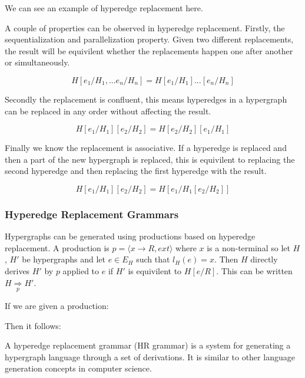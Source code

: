     We can see an example of hyperedge replacement here.
    
    

    A couple of properties can be observed in hyperedge replacement. Firstly, the sequentialization and parallelization property. Given two different replacements, the result will be equivilent whether the replacements happen one after another or simultaneously.

    \begin{equation}
    H[e_1/H_1,...e_n/H_n] = H[e_1/H_1]...[e_n/H_n]
    \end{equation}

    Secondly the replacement is confluent, this means hyperedges in a hypergraph can be replaced in any order without affecting the result.

    \begin{equation}
    H[e_1/H_1][e_2/H_2] = H[e_2/H_2][e_1/H_1]
    \end{equation}

    Finally we know the replacement is associative. If a hyperedge is replaced and then a part of the new hypergraph is replaced, this is equivilent to replacing the second hyperedge and then replacing the first hyperedge with the result.

    \begin{equation}
    H[e_1/H_1][e_2/H_2] = H[e_1/H_1 [e_2/H_2]]
    \end{equation}

  \subsubsection{Hyperedge Replacement Grammars}

    Hypergraphs can be generated using productions based on hyperedge replacement. A production is $p = \langle x \to R, ext \rangle$ where $x$ is a non-terminal so let $H$, $H'$ be hypergraphs and let $e \in E_H$ such that $l_{H}(e) = x$. Then $H$ directly derives $H'$ by $p$ applied to $e$ if $H'$ is equivilent to $H[e / R]$. This can be written $H \underset{p}{\Rightarrow} H'$.

    If we are given a production:
    

    Then it follows:
    

    A hyperedge replacement grammar (HR grammar) is a system for generating a hypergraph language through a set of derivations. It is similar to other language generation concepts in computer science.

